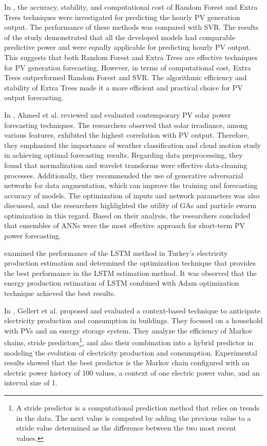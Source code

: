 In \cite{AHMAD2018465}, the accuracy, stability, and computational cost of Random Forest and Extra Trees techniques were investigated for predicting the hourly PV generation output.
The performance of these methods was compared with SVR.
The results of the study demonstrated that all the developed models had comparable predictive power and were equally applicable for predicting hourly PV output.
This suggests that both Random Forest and Extra Trees are effective techniques for PV generation forecasting.
However, in terms of computational cost, Extra Trees outperformed Random Forest and SVR.
The algorithmic efficiency and stability of Extra Trees made it a more efficient and practical choice for PV output forecasting.

In \cite{AHMED2020109792}, Ahmed et al. reviewed and evaluated contemporary PV solar power forecasting techniques.
The researchers observed that solar irradiance, among various features, exhibited the highest correlation with PV output.
Therefore, they emphasized the importance of weather classification and cloud motion study in achieving optimal forecasting results.
Regarding data preprocessing, they found that normalization and wavelet transforms were effective data-cleaning processes.
Additionally, they recommended the use of generative adversarial networks for data augmentation, which can improve the training and forecasting accuracy of models.
The optimization of inputs and network parameters was also discussed, and the researchers highlighted the utility of GAs and particle swarm optimization in this regard.
Based on their analysis, the researchers concluded that ensembles of ANNs were the most effective approach for short-term PV power forecasting.

\cite{9848724} examined the performance of the LSTM method in Turkey's electricity production estimation and determined the optimization technique that provides the best performance in the LSTM estimation method.
It was observed that the energy production estimation of LSTM combined with Adam optimization technique achieved the best results.

In \cite{GELLERT2019546}, Gellert et al. proposed and evaluated a context-based technique to anticipate electricity production and consumption in buildings.
They focused on a household with PVs and an energy storage system.
They analyze the efficiency of Markov chains, stride predictors\footnote{A stride predictor is a computational prediction method that relies on trends in the data. The next value is computed by adding the previous value to a stride value determined as the difference between the two most recent values.}, and also their combination into a hybrid predictor in modeling the evolution of electricity production and consumption.
Experimental results showed that the best predictor is the Markov chain configured with an electric power history of 100 values, a context of one electric power value, and an interval size of 1.

